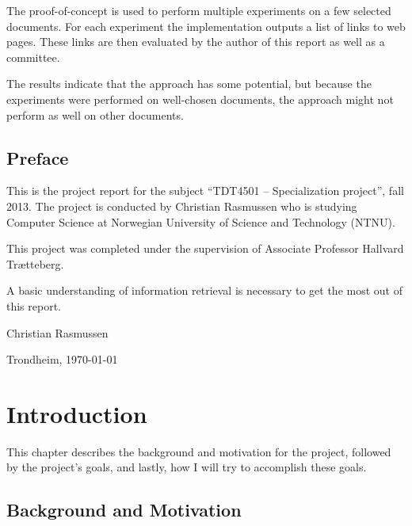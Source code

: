 \documentclass[a4paper]{book}
\newcommand{\thesisAuthor}{Christian Rasmussen}
\begin{document}
The proof-of-concept is used to perform multiple experiments on a few selected documents. For each experiment the implementation outputs a list of links to web pages. These links are then evaluated by the author of this report as well as a committee.

The results indicate that the approach has some potential, but because the experiments were performed on well-chosen documents, the approach might not perform as well on other documents.

\clearpage


\section*{Preface}

This is the project report for the subject ``TDT4501 -- Specialization project'', fall 2013. The project is conducted by Christian Rasmussen who is studying Computer Science at Norwegian University of Science and Technology (NTNU).

This project was completed under the supervision of Associate Professor \mbox{Hallvard} \mbox{Trætteberg}.

A basic understanding of information retrieval is necessary to get the most out of this report.

\vfill

\hfill \thesisAuthor\par
\hfill Trondheim, \today\par

\clearpage


\tableofcontents


\listoffigures


\listoftables


\mainmatter

\chapter{Introduction}
\label{cha:introduction}

This chapter describes the background and motivation for the project, followed by the project's goals, and lastly, how I will try to accomplish these goals.

\section{Background and Motivation}
\label{sec:backgroundAndMotivation}
\end{document}

